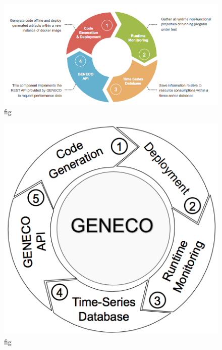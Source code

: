 \begin{figure}[!t]
	\centering
	\includegraphics[width=1\hsize]{Ressources/geneco approach.png}
	\caption{fig}
\end{figure}

\begin{figure}[!t]
	\centering
	\includegraphics[width=1\hsize]{Ressources/genecoApproach22.png}
	\caption{fig}
\end{figure}
\iffalse
